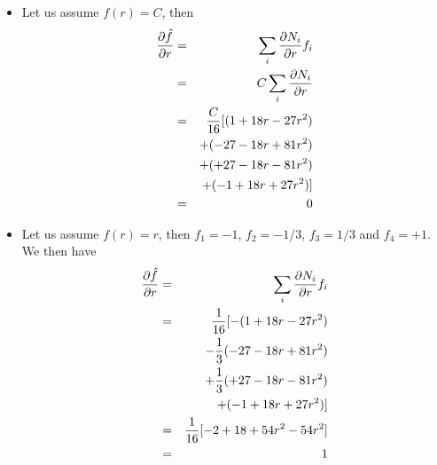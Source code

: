\begin{itemize}
\item
Let us assume $f(r)=C$, then
\begin{eqnarray}
\frac{\partial \hat{f}}{\partial r} 
&=& \sum_i \frac{\partial N_i}{\partial r} f_i  \nonumber\\
&=&  C \sum_i \frac{\partial N_i}{\partial r}  \nonumber\\
&=& \frac{C}{16} [  (  1 +18r - 27r^2 ) \nonumber\\
&&+ (-27 -18r + 81r^2 )  \nonumber\\
&&+  (+27 -18r - 81r^2 ) \nonumber\\
&&+ ( -1 +18r + 27r^2 ) ]  \nonumber\\
&=& 0 \nonumber
\end{eqnarray}

\item
Let us assume $f(r)= r$, then $f_1=-1$, $f_2=-1/3$, $f_3=1/3$ and $f_4=+1$. We then have
\begin{eqnarray}
\frac{\partial \hat{f}}{\partial r} 
&=& \sum_i \frac{\partial N_i}{\partial r} f_i  \nonumber\\
&=& \frac{1}{16} [  -(  1 +18r - 27r^2 ) \nonumber\\ 
&& -\frac{1}{3} (-27 -18r + 81r^2 )  \nonumber\\
&& +\frac{1}{3}  (+27 -18r - 81r^2 ) \nonumber\\
&& + ( -1 +18r + 27r^2 ) ]  \nonumber\\
&=& \frac{1}{16} [-2 + 18 + 54r^2 - 54r^2] \nonumber\\
&=& 1 \nonumber
\end{eqnarray}

\end{itemize}


